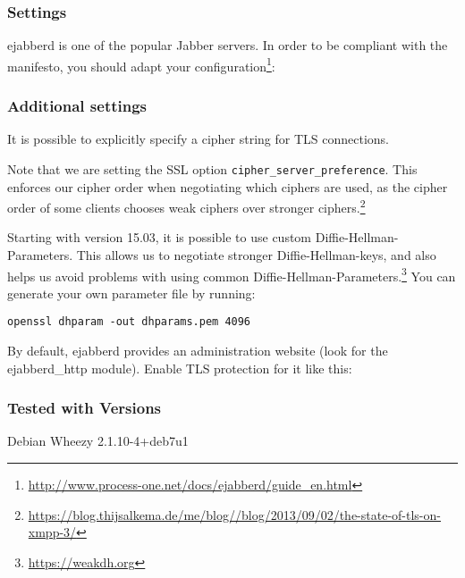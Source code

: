 \subsubsection{Settings}
ejabberd is one of the popular Jabber servers. In order to be compliant
with the manifesto, you should adapt your configuration\footnote{\url{http://www.process-one.net/docs/ejabberd/guide_en.html}}:

% 
\subsubsection{Additional settings}
It is possible to explicitly specify a cipher string for TLS connections.

Note that we are setting the SSL option \texttt{cipher\_server\_preference}. This enforces our cipher order when negotiating which ciphers are used, as the cipher order of some clients chooses weak ciphers over stronger ciphers.\footnote{\url{https://blog.thijsalkema.de/me/blog//blog/2013/09/02/the-state-of-tls-on-xmpp-3/}}

Starting with version 15.03, it is possible to use custom Diffie-Hellman-Parameters. This allows us to negotiate stronger Diffie-Hellman-keys, and also helps us avoid problems with using common Diffie-Hellman-Parameters.\footnote{\url{https://weakdh.org}} You can generate your own parameter file by running:
\begin{lstlisting}
openssl dhparam -out dhparams.pem 4096
\end{lstlisting}

By default, ejabberd provides an administration website (look for the ejabberd\_http module). Enable TLS protection for it like this:


\subsubsection{Tested with Versions}
\begin{itemize*}
\item Debian Wheezy 2.1.10-4+deb7u1
\end{itemize*}
